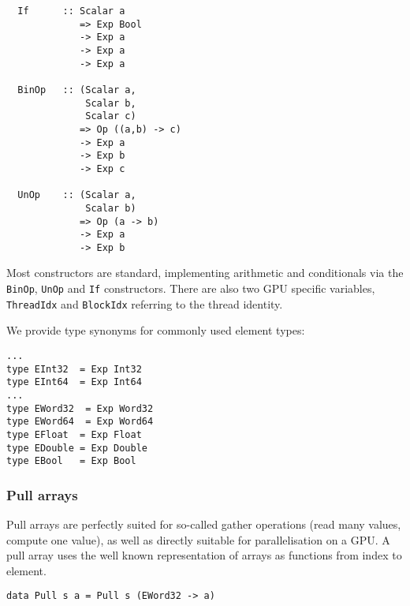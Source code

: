 \begin{small}
\begin{Verbatim}             
  If      :: Scalar a 
             => Exp Bool
             -> Exp a 
             -> Exp a 
             -> Exp a 
                          
  BinOp   :: (Scalar a,
              Scalar b, 
              Scalar c) 
             => Op ((a,b) -> c) 
             -> Exp a 
             -> Exp b 
             -> Exp c 
             
  UnOp    :: (Scalar a, 
              Scalar b)
             => Op (a -> b)            
             -> Exp a 
             -> Exp b 
\end{Verbatim}
\end{small}
Most constructors are standard, implementing arithmetic and conditionals 
via the {\tt BinOp}, {\tt UnOp} and {\tt If} constructors. There are also two 
GPU specific variables, {\tt ThreadIdx} and {\tt BlockIdx} referring to the thread 
identity. 

We provide type synonyms for commonly used element types: 
\begin{small} 
\begin{Verbatim}[samepage=true]
...
type EInt32  = Exp Int32
type EInt64  = Exp Int64
...
type EWord32  = Exp Word32 
type EWord64  = Exp Word64 
type EFloat  = Exp Float  
type EDouble = Exp Double 
type EBool   = Exp Bool 
\end{Verbatim}
\end{small}   

\subsubsection{Pull arrays}


Pull arrays are perfectly suited for so-called gather operations (read 
many values, compute one value), as well as directly suitable for parallelisation 
on a GPU. A pull array uses the well known representation of arrays as 
functions from index to element. 

\begin{small} 
\begin{verbatim} 
data Pull s a = Pull s (EWord32 -> a) 
\end{verbatim} 
\end{small}

